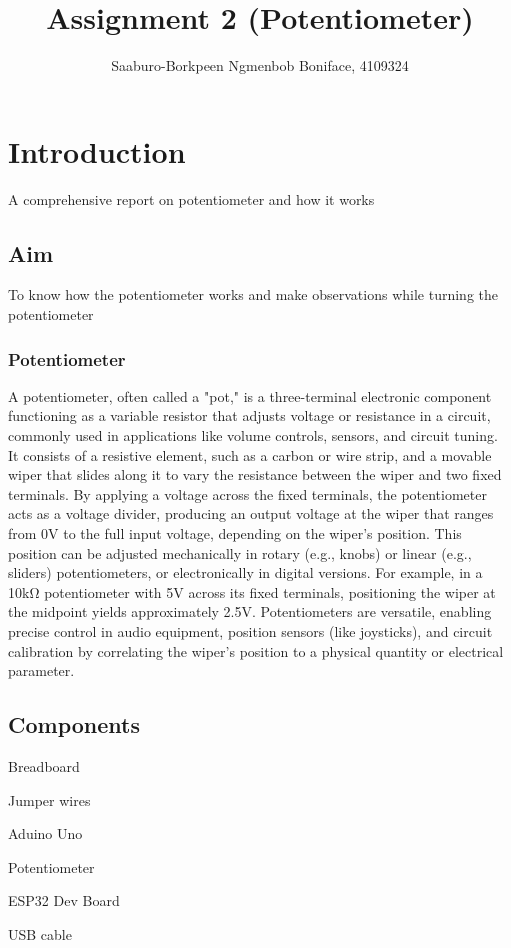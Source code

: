 \documentclass{article}
\title{Assignment 2 (Potentiometer)}
\author{Saaburo-Borkpeen Ngmenbob Boniface, 4109324}
\begin{document}
\maketitle


\section{Introduction}

A comprehensive report on potentiometer and how it works

\subsection{Aim}

To know how the potentiometer works and make observations while turning the potentiometer

\subsubsection{Potentiometer}
A potentiometer, often called a "pot," is a three-terminal electronic component functioning as a variable resistor that adjusts voltage or resistance in a circuit, commonly used in applications like volume controls, sensors, and circuit tuning. It consists of a resistive element, such as a carbon or wire strip, and a movable wiper that slides along it to vary the resistance between the wiper and two fixed terminals. By applying a voltage across the fixed terminals, the potentiometer acts as a voltage divider, producing an output voltage at the wiper that ranges from 0V to the full input voltage, depending on the wiper’s position. This position can be adjusted mechanically in rotary (e.g., knobs) or linear (e.g., sliders) potentiometers, or electronically in digital versions. For example, in a 10kΩ potentiometer with 5V across its fixed terminals, positioning the wiper at the midpoint yields approximately 2.5V. Potentiometers are versatile, enabling precise control in audio equipment, position sensors (like joysticks), and circuit calibration by correlating the wiper’s position to a physical quantity or electrical parameter.
\subsection{Components}

 \item  Breadboard
 \item  Jumper wires
 \item  Aduino Uno
 \item  Potentiometer
 \item  ESP32 Dev Board
 \item  USB cable
\end{document}
